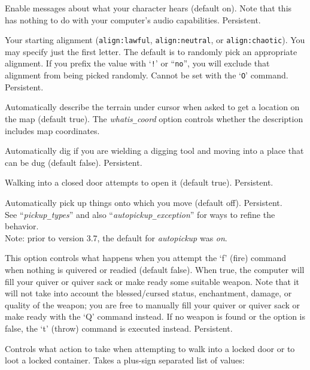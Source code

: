 \blist{}
\item[\ib{acoustics}]
Enable messages about what your character hears (default on).
Note that this has nothing to do with your computer's audio capabilities.
Persistent.
\item[\ib{align}]
Your starting alignment ({\tt align:lawful}, {\tt align:neutral},
or {\tt align:chaotic}).  You may specify just the first letter.
The default is to randomly pick an appropriate alignment.
If you prefix the value with `{\tt !}' or ``{\tt no}'', you will
exclude that alignment from being picked randomly.
Cannot be set with the `{\tt O}' command.  Persistent.
\item[\ib{autodescribe}]
Automatically describe the terrain under cursor when asked to get a location
on the map (default true).
The {\it whatis\verb+_+coord\/}
option controls whether the description includes map coordinates.
\item[\ib{autodig}]
Automatically dig if you are wielding a digging tool and moving into a place
that can be dug (default false).  Persistent.
\item[\ib{autoopen}]
Walking into a closed door attempts to open it (default true).
Persistent.
\item[\ib{autopickup}]
Automatically pick up things onto which you move (default off).
Persistent.
\\
See ``{\it pickup\verb+_+types\/}'' and also
``{\it autopickup\verb+_+exception\/}'' for ways to refine the behavior.
\\
Note: prior to version 3.7, the default for {\it autopickup\/} was {\it on}.
\item[\ib{autoquiver}]
This option controls what happens when you attempt the `f' (fire)
command when nothing is quivered or readied (default false).
When true, the computer will fill
your quiver or quiver sack or make ready some suitable weapon.
Note that it will not take
into account the blessed/cursed status, enchantment, damage, or
quality of the weapon; you are free to manually fill your quiver
or quiver sack or make ready
with the `Q' command instead.
If no weapon is found or the option is
false, the `t' (throw) command is executed instead.  Persistent.
\item[\ib{autounlock}]
Controls what action to take when attempting to walk into a locked door
or to loot a locked container.
Takes a plus-sign separated list of values:
\newlength{\auwidth}
